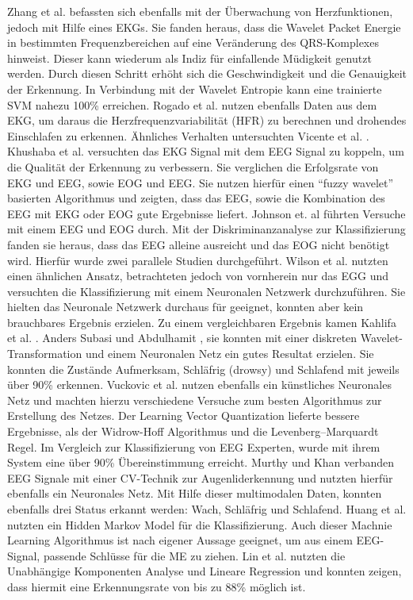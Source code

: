 {Zhang et al. \cite{zhang_6513058} befassten sich ebenfalls mit der Überwachung von Herzfunktionen, jedoch mit Hilfe eines EKGs. Sie fanden heraus, dass die Wavelet Packet Energie in bestimmten Frequenzbereichen auf eine Veränderung des QRS-Komplexes hinweist. Dieser kann wiederum als Indiz für einfallende Müdigkeit genutzt werden. Durch diesen Schritt erhöht sich  die Geschwindigkeit und die Genauigkeit der Erkennung. In Verbindung mit der Wavelet Entropie kann eine trainierte SVM nahezu 100\% erreichen. Rogado et al. \cite{Rogado_4913155} nutzen ebenfalls Daten aus dem EKG, um daraus die Herzfrequenzvariabilität (HFR) zu berechnen und drohendes Einschlafen zu erkennen. Ähnliches Verhalten untersuchten Vicente et al. \cite{Vicente_6164509}. \\

Khushaba et al. \cite{Khushaba_5580017} versuchten das EKG Signal mit dem EEG Signal zu koppeln, um die Qualität der Erkennung zu verbessern. Sie verglichen die Erfolgsrate von EKG und EEG, sowie EOG und EEG. Sie nutzen hierfür einen "`fuzzy wavelet"' basierten Algorithmus und zeigten, dass das EEG, sowie die Kombination des EEG mit EKG oder EOG gute Ergebnisse liefert. Johnson et. al \cite{Johnson11} führten Versuche mit einem EEG und EOG durch. Mit der Diskriminanzanalyse zur Klassifizierung fanden sie heraus, dass das EEG alleine ausreicht und das EOG nicht benötigt wird. Hierfür wurde zwei parallele Studien durchgeführt. Wilson et al. \cite{wilson_890161} nutzten einen ähnlichen Ansatz, betrachteten jedoch von vornherein nur das EGG und versuchten die Klassifizierung mit einem Neuronalen Netzwerk durchzuführen. Sie hielten das Neuronale Netzwerk durchaus für geeignet, konnten aber kein brauchbares Ergebnis erzielen. Zu einem vergleichbaren Ergebnis kamen Kahlifa et al. \cite{khalifa_893852}. Anders Subasi und Abdulhamit \cite{Subasi:2005:ARA:1707423.1707550}, sie konnten mit einer diskreten Wavelet-Transformation und einem Neuronalen Netz ein gutes Resultat erzielen. Sie konnten die Zustände Aufmerksam, Schläfrig (drowsy) und Schlafend mit jeweils über 90\% erkennen. Vuckovic et al. \cite{Vuckovic2002349} nutzen ebenfalls ein künstliches Neuronales Netz und machten hierzu verschiedene Versuche zum besten Algorithmus zur Erstellung des Netzes. Der Learning Vector Quantization lieferte bessere Ergebnisse, als der Widrow-Hoff Algorithmus und die Levenberg–Marquardt Regel. Im Vergleich zur Klassifizierung von EEG Experten, wurde mit ihrem System  eine über 90\% Übereinstimmung erreicht. Murthy und Khan \cite{Murthy_1} verbanden EEG Signale mit einer CV-Technik zur Augenliderkennung und nutzten hierfür ebenfalls ein Neuronales Netz. Mit Hilfe dieser multimodalen Daten, konnten ebenfalls drei Status erkannt werden: Wach, Schläfrig und Schlafend.
Huang et al. \cite{Huang_548971} nutzten ein Hidden Markov Model für die Klassifizierung. Auch dieser Machnie Learning Algorithmus ist nach eigener Aussage geeignet, um aus einem EEG-Signal, passende Schlüsse für die \acl{ME} zu ziehen. Lin et al. \cite{Lin05eeg-baseddrowsiness} nutzten die Unabhängige Komponenten Analyse und Lineare Regression und konnten zeigen, dass hiermit eine Erkennungsrate von bis zu 88\% möglich ist.\\

}
